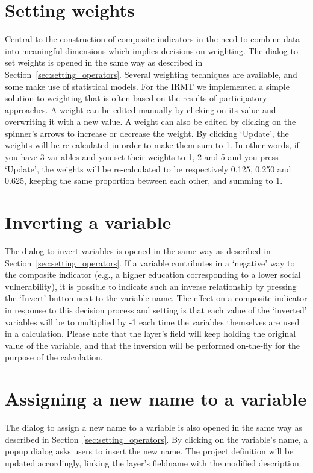 \section{Setting weights}

Central to the construction of composite indicators in the need to combine data
into meaningful dimensions which implies decisions on weighting. The dialog to
set weights is opened in the same way as described in
Section~\ref{sec:setting_operators}. Several weighting techniques are
available, and some make use of statistical models.  For the IRMT we
implemented a simple solution to weighting that is often based on the results
of participatory approaches. A weight can be edited manually by clicking on its
value and overwriting it with a new value. A weight can also be edited by
clicking on the spinner's arrows to increase or decrease the weight.  By
clicking `Update', the weights will be re-calculated in order to make them sum
to 1. In other words, if you have 3 variables and you set their weights to 1, 2
and 5 and you press `Update', the weights will be re-calculated to be
respectively 0.125, 0.250 and 0.625, keeping the same proportion between each
other, and summing to 1.


\section{Inverting a variable}

The dialog to invert variables is opened in the same way as described in
Section~\ref{sec:setting_operators}. If a variable contributes in a `negative'
way to the composite indicator (e.g., a higher education corresponding to a
lower social vulnerability), it is possible to indicate such an inverse
relationship by pressing the `Invert' button next to the variable name. The
effect on a composite indicator in response to this decision process and
setting is that each value of the `inverted' variables will be to multiplied by
-1 each time the variables themselves are used in a calculation.  Please note
that the layer's field will keep holding the original value of the variable,
and that the inversion will be performed on-the-fly for the purpose of the
calculation.


\section{Assigning a new name to a variable}

The dialog to assign a new name to a variable is also opened in the same way as
described in Section~\ref{sec:setting_operators}. By clicking on the variable's
name, a popup dialog asks users to insert the new name. The project definition
will be updated accordingly, linking the layer's fieldname with the modified
description.


